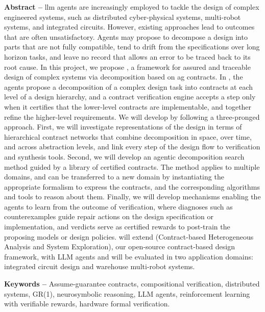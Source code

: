 \textbf{Abstract --} \Gls{llm} agents are increasingly employed to tackle the design of complex engineered systems, such as distributed cyber-physical systems, multi-robot systems, and integrated circuits. However, existing approaches lead to outcomes that are often unsatisfactory. Agents may propose to decompose a design into parts that are not fully compatible, tend to drift from the specifications over long horizon tasks, and leave no record that allows an error to be traced back to its root cause. In this project, we propose \sysname, a framework for assured and traceable design of complex systems via decomposition  based on \gls{ag} contracts. In \sysname, the agents propose a decomposition of a complex design task into  contracts at each level of a design hierarchy, and a contract verification engine accepts a step only when it certifies that the lower-level contracts are implementable, and together refine the higher-level requirements. We will develop \sysname by following a three-pronged approach. First, we will investigate representations of the design in terms of hierarchical contract networks that combine decomposition in space, over time, and across abstraction levels, and link every step of the design flow to verification and synthesis tools. Second, we will develop an agentic decomposition search method guided by a library of certified contracts. The method applies to multiple domains, and can be transferred to a new domain by instantiating the appropriate  formalism to express the contracts, and the corresponding algorithms and tools to reason about them. Finally, we will develop mechanisms enabling the agents to learn from the outcome of verification, where diagnoses such as counterexamples guide repair actions on the design specification or implementation, and verdicts serve as certified rewards to post-train the proposing models or design policies. \sysname will extend \chase (Contract-based Heterogeneous Analysis and System Exploration), our open-source contract-based design framework, with LLM agents and will be evaluated in two application domains: integrated circuit design and warehouse multi-robot systems.

\textbf{Keywords --} Assume-guarantee contracts, compositional verification, distributed systems, GR(1), neurosymbolic reasoning, LLM agents, reinforcement learning with verifiable rewards, hardware formal verification.
